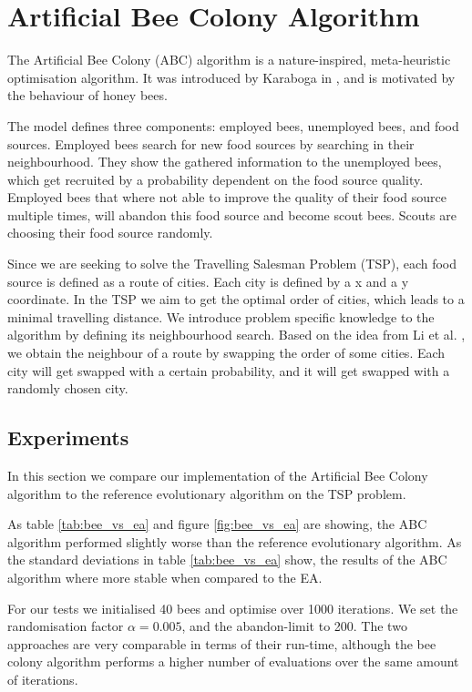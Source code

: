 \section{Artificial Bee Colony Algorithm}

The Artificial Bee Colony (ABC) algorithm is a nature-inspired, meta-heuristic optimisation
algorithm. It was introduced by Karaboga in \cite{beecolony}, and is motivated by the behaviour of honey bees.

The model defines three components: employed bees, unemployed bees, and food sources. Employed bees search for new food sources by searching in their neighbourhood. They show the gathered information to the unemployed bees, which get recruited by a probability dependent on the food source quality. Employed bees that where not able to improve the quality of their food source multiple times, will abandon this food source and become scout bees. Scouts are choosing their food source randomly.

Since we are seeking to solve the Travelling Salesman Problem (TSP), each food source is defined as a route of cities. Each city is defined by a x and a y coordinate. In the TSP we aim to get the optimal order of cities, which leads to a minimal travelling distance. We introduce problem specific knowledge to the algorithm by defining its neighbourhood search. Based on the idea from Li et al. \cite{beetsp}, we obtain the neighbour of a route by swapping the order of some cities. Each city will get swapped with a certain probability, and it will get swapped with a randomly chosen city.


\subsection{Experiments}

In this section we compare our implementation of the Artificial Bee Colony algorithm to the
reference evolutionary algorithm on the TSP problem.

As table \ref{tab:bee_vs_ea} and figure \ref{fig:bee_vs_ea} are showing, the ABC algorithm performed slightly worse than the reference evolutionary algorithm. As the standard deviations in table \ref{tab:bee_vs_ea} show, the results of the ABC algorithm where more stable when compared to the EA. 

For our tests we initialised 40 bees and optimise over 1000 iterations. We set the randomisation factor $\alpha = 0.005$, and the abandon-limit to 200.
The two approaches are very comparable in terms of their run-time, although the bee colony algorithm performs a higher number of evaluations over the same amount of iterations.

